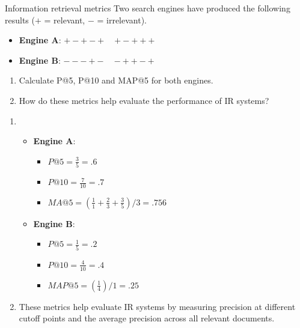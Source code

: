 \documentclass{article}
\begin{document}
\begin{exercise}{Information retrieval metrics}\label{ex:ir-metrics}
  Two search engines have produced the following results ($+$ = relevant, $-$ = irrelevant).
  \begin{itemize}
    \item \textbf{Engine A}: $+-+-+\quad+-+++$
    \item \textbf{Engine B}: $---+-\quad-++-+$
  \end{itemize}

  \begin{enumerate}
    \item Calculate P@5, P@10 and MAP@5 for both engines.
    \item How do these metrics help evaluate the performance of IR systems?
  \end{enumerate}

  \begin{solution}
    \begin{enumerate}
      \item \begin{itemize}
          \item \textbf{Engine A}:
            \begin{itemize}
              \item $P@5 = \frac{3}{5} = .6$
              \item $P@10 = \frac{7}{10} = .7$
              \item $MA@5 = (\frac{1}{1} + \frac{2}{3} + \frac{3}{5}) / 3 = .756$
            \end{itemize}
          \item \textbf{Engine B}:
            \begin{itemize}
              \item $P@5 = \frac{1}{5} = .2$
              \item $P@10 = \frac{4}{10} = .4$
              \item $MAP@5 = (\frac{1}{4}) / 1 = .25$
            \end{itemize}
        \end{itemize}
      \item These metrics help evaluate IR systems by measuring precision at different cutoff points and the average precision across all relevant documents.
    \end{enumerate}
  \end{solution}
\end{exercise}
\end{document}
